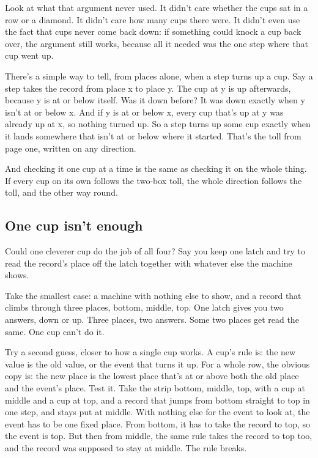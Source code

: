 \documentclass[11pt,twoside]{article}
\theoremstyle{thielethm}
\theoremstyle{thieledef}
\theoremstyle{thieledef}
\theoremstyle{thieledef}
\theoremstyle{thielethm}
\theoremstyle{thieleobs}
\theoremstyle{thielethm}
\begin{document}
Look at what that argument never used. It didn't care whether the cups sat in a row or a diamond. It didn't care how many cups there were. It didn't even use the fact that cups never come back down: if something could knock a cup back over, the argument still works, because all it needed was the one step where that cup went up.

There's a simple way to tell, from places alone, when a step turns up a cup. Say a step takes the record from place x to place y. The cup at y is up afterwards, because y is at or below itself. Was it down before? It was down exactly when y isn't at or below x. And if y is at or below x, every cup that's up at y was already up at x, so nothing turned up. So a step turns up some cup exactly when it lands somewhere that isn't at or below where it started. That's the toll from page one, written on any direction.

And checking it one cup at a time is the same as checking it on the whole thing. If every cup on its own follows the two-box toll, the whole direction follows the toll, and the other way round.

\subsection{One cup isn't enough}

Could one cleverer cup do the job of all four? Say you keep one latch and try to read the record's place off the latch together with whatever else the machine shows.

Take the smallest case: a machine with nothing else to show, and a record that climbs through three places, bottom, middle, top. One latch gives you two answers, down or up. Three places, two answers. Some two places get read the same. One cup can't do it.

Try a second guess, closer to how a single cup works. A cup's rule is: the new value is the old value, or the event that turns it up. For a whole row, the obvious copy is: the new place is the lowest place that's at or above both the old place and the event's place. Test it. Take the strip bottom, middle, top, with a cup at middle and a cup at top, and a record that jumps from bottom straight to top in one step, and stays put at middle. With nothing else for the event to look at, the event has to be one fixed place. From bottom, it has to take the record to top, so the event is top. But then from middle, the same rule takes the record to top too, and the record was supposed to stay at middle. The rule breaks.
\end{document}
